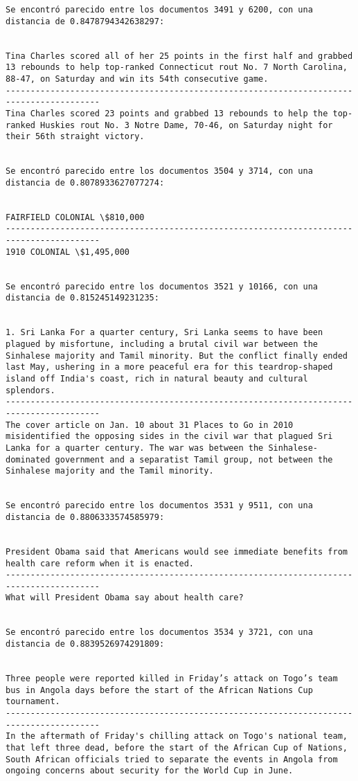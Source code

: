 \documentclass[11pt]{article}
\begin{document}
\begin{Verbatim}[commandchars=\\\{\}]
Se encontró parecido entre los documentos 3491 y 6200, con una distancia de 0.8478794342638297:


Tina Charles scored all of her 25 points in the first half and grabbed 13 rebounds to help top-ranked Connecticut rout No. 7 North Carolina, 88-47, on Saturday and win its 54th consecutive game.
-----------------------------------------------------------------------------------------
Tina Charles scored 23 points and grabbed 13 rebounds to help the top-ranked Huskies rout No. 3 Notre Dame, 70-46, on Saturday night for their 56th straight victory.


Se encontró parecido entre los documentos 3504 y 3714, con una distancia de 0.8078933627077274:


FAIRFIELD COLONIAL \$810,000
-----------------------------------------------------------------------------------------
1910 COLONIAL \$1,495,000


Se encontró parecido entre los documentos 3521 y 10166, con una distancia de 0.815245149231235:


1. Sri Lanka For a quarter century, Sri Lanka seems to have been plagued by misfortune, including a brutal civil war between the Sinhalese majority and Tamil minority. But the conflict finally ended last May, ushering in a more peaceful era for this teardrop-shaped island off India's coast, rich in natural beauty and cultural splendors.
-----------------------------------------------------------------------------------------
The cover article on Jan. 10 about 31 Places to Go in 2010 misidentified the opposing sides in the civil war that plagued Sri Lanka for a quarter century. The war was between the Sinhalese-dominated government and a separatist Tamil group, not between the Sinhalese majority and the Tamil minority.


Se encontró parecido entre los documentos 3531 y 9511, con una distancia de 0.8806333574585979:


President Obama said that Americans would see immediate benefits from health care reform when it is enacted.
-----------------------------------------------------------------------------------------
What will President Obama say about health care?


Se encontró parecido entre los documentos 3534 y 3721, con una distancia de 0.8839526974291809:


Three people were reported killed in Friday’s attack on Togo’s team bus in Angola days before the start of the African Nations Cup tournament.
-----------------------------------------------------------------------------------------
In the aftermath of Friday's chilling attack on Togo's national team, that left three dead, before the start of the African Cup of Nations, South African officials tried to separate the events in Angola from ongoing concerns about security for the World Cup in June.



\end{Verbatim}
\end{document}
